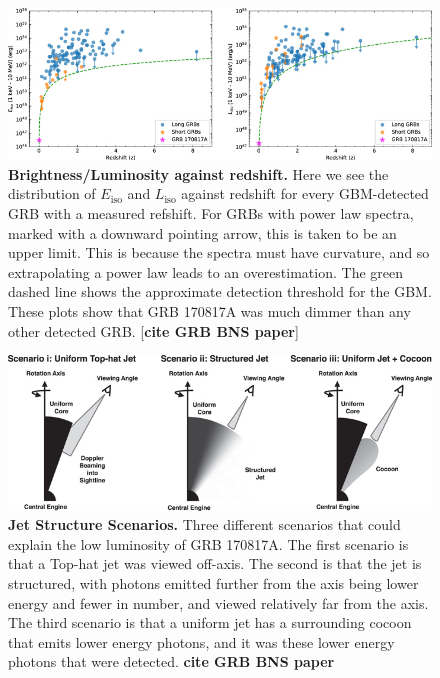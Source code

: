 \documentclass[11pt]{cuthesis}
\begin{document}
\begin{figure} %
\begin{center}
\includegraphics[width=1.0\linewidth]{grb_z_brightness.jpg}
\end{center}
\caption{\textbf{Brightness/Luminosity against redshift.} Here we see the distribution of $E_\text{iso}$ and $L_\text{iso}$ against redshift for every GBM-detected GRB with a measured refshift. For GRBs with power law spectra, marked with a downward pointing arrow, this is taken to be an upper limit. This is because the spectra must have curvature, and so extrapolating a power law leads to an overestimation. The green dashed line shows the approximate detection threshold for the GBM. These plots show that GRB 170817A was much dimmer than any other detected GRB. [\textbf{cite GRB BNS paper}] }
\label{fig:brightness_z}
\end{figure}

\begin{figure} %
\begin{center}
\includegraphics[width=1.0\linewidth]{jet_structure.jpg}
\end{center}
\caption{\textbf{Jet Structure Scenarios.} Three different scenarios that could explain the low luminosity of GRB 170817A. The first scenario is that a Top-hat jet was viewed off-axis. The second is that the jet is structured, with photons emitted further from the axis being lower energy and fewer in number, and viewed relatively far from the axis. The third scenario is that a uniform jet has a surrounding cocoon that emits lower energy photons, and it was these lower energy photons that were detected. \textbf{cite GRB BNS paper} }
\label{fig:jet}
\end{figure}
\end{document}
